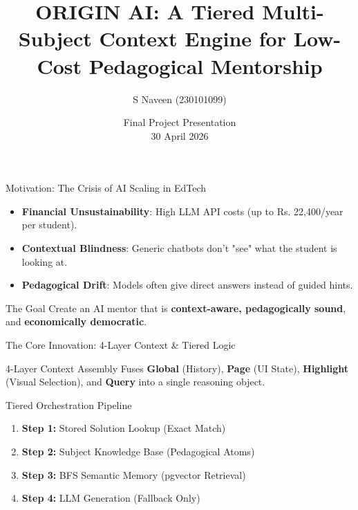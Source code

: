 \documentclass[aspectratio=169]{beamer}
\title[Origin AI]{ORIGIN AI: A Tiered Multi-Subject Context Engine for Low-Cost Pedagogical Mentorship}
\subtitle{}
\author[S Naveen (230101099)]{S Naveen (230101099)}
\institute[IIITM]{Indian Institute of Information Technology Senapati, Manipur \\ Supervised by: Dr. Nongmeikapam Kishorjit Singh}
\date[30 April 2026]{Final Project Presentation \\ 30 April 2026}
\begin{document}
\begin{frame}
    \titlepage
\end{frame}

\begin{frame}{Motivation: The Crisis of AI Scaling in EdTech}
    \begin{itemize}
        \item \textbf{Financial Unsustainability}: High LLM API costs (up to Rs. 22,400/year per student).
        \item \textbf{Contextual Blindness}: Generic chatbots don't "see" what the student is looking at.
        \item \textbf{Pedagogical Drift}: Models often give direct answers instead of guided hints.
    \end{itemize}
    \vspace{0.4cm}
    \begin{block}{The Goal}
        Create an AI mentor that is \textbf{context-aware, pedagogically sound}, and \textbf{economically democratic}.
    \end{block}
\end{frame}

\begin{frame}{The Core Innovation: 4-Layer Context \& Tiered Logic}
    \begin{block}{4-Layer Context Assembly}
        Fuses \textbf{Global} (History), \textbf{Page} (UI State), \textbf{Highlight} (Visual Selection), and \textbf{Query} into a single reasoning object.
    \end{block}
    
    \begin{block}{Tiered Orchestration Pipeline}
        \begin{enumerate}
            \item \textbf{Step 1:} Stored Solution Lookup (Exact Match)
            \item \textbf{Step 2:} Subject Knowledge Base (Pedagogical Atoms)
            \item \textbf{Step 3:} BFS Semantic Memory (pgvector Retrieval)
            \item \textbf{Step 4:} LLM Generation (Fallback Only)
        \end{enumerate}
    \end{block}
\end{frame}
\end{document}
